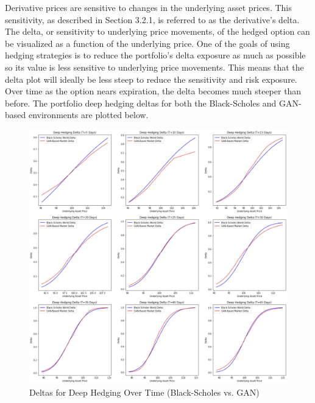 \noindent Derivative prices are sensitive to changes in the underlying asset prices. This sensitivity, as described in Section 3.2.1, is referred to as the derivative's delta. The delta, or sensitivity to underlying price movements, of the hedged option can be visualized as a function of the underlying price. One of the goals of using hedging strategies is to reduce the portfolio's delta exposure as much as possible so its value is less sensitive to underlying price movements. This means that the delta plot will ideally be less steep to reduce the sensitivity and risk exposure. Over time as the option nears expiration, the delta becomes much steeper than before. The portfolio deep hedging deltas for both the Black-Scholes and GAN-based environments are plotted below.
\begin{figure}[h]
\centering
\includegraphics[width=14cm]{templates/assets/drl/delta.png}
\caption{Deltas for Deep Hedging Over Time (Black-Scholes vs. GAN)}
\end{figure}

